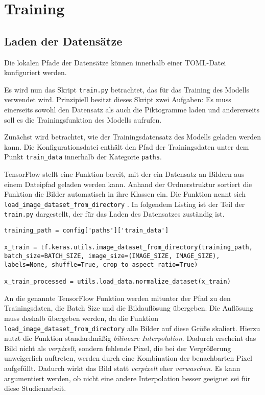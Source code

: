 \section{Training}

\subsection{Laden der Datensätze}
Die lokalen Pfade der Datensätze können innerhalb einer \ac{TOML}-Datei konfiguriert werden. 


Es wird nun das Skript \texttt{train.py} betrachtet, das für das Training des Modells verwendet wird. Prinzipiell besitzt dieses Skript zwei Aufgaben: Es muss einerseits sowohl den Datensatz als auch die Piktogramme laden und andererseits soll es die Trainingsfunktion des Modells aufrufen.

Zunächst wird betrachtet, wie der Trainingsdatensatz des Modells geladen werden kann. Die Konfigurationsdatei enthält den Pfad der Trainingsdaten unter dem Punkt \texttt{train_data} innerhalb der Kategorie \texttt{paths}.

TensorFlow stellt eine Funktion bereit, mit der ein Datensatz an Bildern aus einem Dateipfad geladen werden kann. Anhand der Ordnerstruktur sortiert die Funktion die Bilder automatisch in ihre Klassen ein. Die Funktion nennt sich \texttt{load_image_dataset_from_directory} \cite{tf-keras-utils}. In folgendem Listing ist der Teil der \texttt{train.py} dargestellt, der für das Laden des Datensatzes zuständig ist.

\begin{code}
   \label{code:train-set-laden}
   \begin{verbatim}
training_path = config['paths']['train_data']

x_train = tf.keras.utils.image_dataset_from_directory(training_path, batch_size=BATCH_SIZE, image_size=(IMAGE_SIZE, IMAGE_SIZE), labels=None, shuffle=True, crop_to_aspect_ratio=True)

x_train_processed = utils.load_data.normalize_dataset(x_train)
   \end{verbatim}
\end{code}

An die genannte TensorFlow Funktion werden mitunter der Pfad zu den Trainingsdaten, die Batch Size und die Bildauflösung übergeben. Die Auflösung muss deshalb übergeben werden, da die Funktion \texttt{load_image_dataset_from_directory} alle Bilder auf diese Größe skaliert. Hierzu nutzt die Funktion standardmäßig \emph{bilineare Interpolation}. Dadurch erscheint das Bild nicht als \emph{verpixelt}, sondern fehlende Pixel, die bei der Vergrößerung unweigerlich auftreten, werden durch eine Kombination der benachbarten Pixel aufgefüllt. Dadurch wirkt das Bild statt \emph{verpixelt} eher \emph{verwaschen}. Es kann argumentiert werden, ob nicht eine andere Interpolation besser geeignet sei für diese Studienarbeit.

